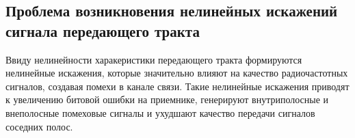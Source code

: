 %
%
%
%
%
%

\subsection{Проблема возникновения нелинейных искажений сигнала передающего тракта} \label{subsec:dpd_task}
Ввиду нелинейности харакеристики передающего тракта формируются нелинейные искажения, которые значительно влияют на качество радиочастотных сигналов, создавая помехи в канале связи. Такие нелинейные искажения приводят к увеличению битовой ошибки на приемнике, генерируют внутриполосные и внеполосные помеховые сигналы и ухудшают качество передачи сигналов соседних полос. 

